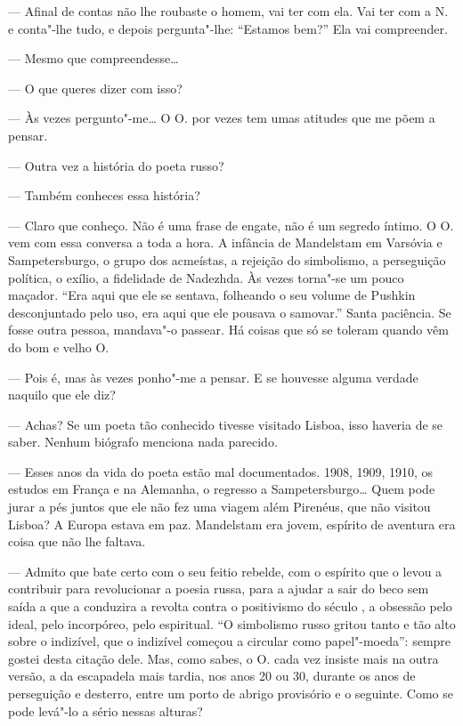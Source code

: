 --- Afinal de contas não lhe roubaste o homem, vai ter com ela. Vai ter
  com a N. e conta"-lhe tudo, e depois pergunta"-lhe: ``Estamos bem?'' Ela vai compreender.

--- Mesmo que compreendesse\ldots{}

--- O que queres dizer com isso?

--- Às vezes pergunto"-me\ldots{} O O. por vezes tem umas atitudes que me põem
  a pensar.

--- Outra vez a história do poeta russo?

--- Também conheces essa história?

--- Claro que conheço. Não é uma frase de engate, não é um segredo íntimo.
  O O. vem com essa conversa a toda a hora. A infância de Mandelstam em
  Varsóvia e Sampetersburgo, o grupo dos acmeístas, a rejeição do
  simbolismo, a perseguição política, o exílio, a fidelidade de
  Nadezhda. Às vezes torna"-se um pouco maçador. ``Era aqui que ele se
  sentava, folheando o seu volume de Pushkin desconjuntado pelo uso, era
  aqui que ele pousava o samovar.'' Santa paciência. Se fosse outra
  pessoa, mandava"-o passear. Há coisas que só se toleram quando vêm do
  bom e velho O.

--- Pois é, mas às vezes ponho"-me a pensar. E se houvesse alguma verdade
  naquilo que ele diz?

--- Achas? Se um poeta tão conhecido tivesse visitado Lisboa, isso
  haveria de se saber. Nenhum biógrafo menciona nada parecido.

--- Esses anos da vida do poeta estão mal documentados. 1908, 1909, 1910,
  os estudos em França e na Alemanha, o regresso a Sampetersburgo\ldots{}
  Quem pode jurar a pés juntos que ele não fez uma viagem além Pirenéus,
  que não visitou Lisboa? A Europa estava em paz. Mandelstam era jovem,
  espírito de aventura era coisa que não lhe faltava.




--- Admito que bate certo com o seu feitio rebelde, com o espírito que o
  levou a contribuir para revolucionar a poesia russa, para a ajudar a
  sair do beco sem saída a que a conduzira a revolta contra o
  positivismo do século , a obsessão pelo ideal, pelo incorpóreo,
  pelo espiritual. ``O simbolismo russo gritou tanto e tão alto sobre o
  indizível, que o indizível começou a circular como papel"-moeda'':
  sempre gostei desta citação dele. Mas, como sabes, o O. cada vez
  insiste mais na outra versão, a da escapadela mais tardia, nos anos 20
  ou 30, durante os anos de perseguição e desterro, entre um porto de
  abrigo provisório e o seguinte. Como se pode levá"-lo a sério nessas
  alturas?

